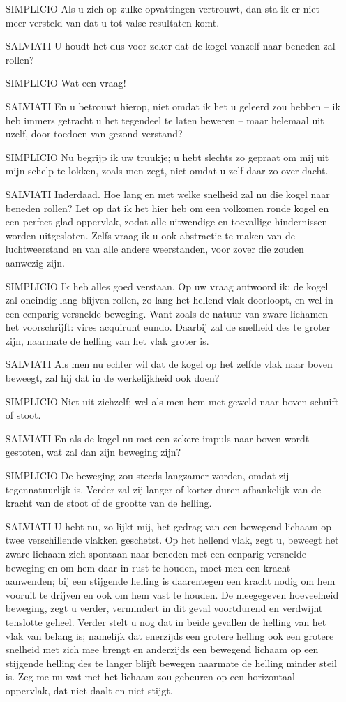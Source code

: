 {\begin{enumerate}
\item[SIMPLICIO]Als u zich op zulke opvattingen vertrouwt, dan sta ik er niet meer versteld van dat u tot valse resultaten komt.
\item[SALVIATI]U houdt het dus voor zeker dat de kogel vanzelf naar beneden zal rollen?
\item[SIMPLICIO]Wat een vraag!
\item[SALVIATI]En u betrouwt hierop, niet omdat ik het u geleerd zou hebben -- ik heb immers getracht u het tegendeel te laten beweren -- maar helemaal uit uzelf, door toedoen van gezond verstand?
\item[SIMPLICIO]Nu begrijp ik uw truukje; u hebt slechts zo gepraat om mij uit mijn schelp te lokken, zoals men zegt, niet omdat u zelf daar zo over dacht.
\item[SALVIATI]Inderdaad. Hoe lang en met welke snelheid zal nu die kogel naar beneden rollen? Let op dat ik het hier heb om een volkomen ronde kogel en een perfect glad oppervlak, zodat alle uitwendige en toevallige hindernissen worden uitgesloten. Zelfs vraag ik u ook abstractie te maken van de luchtweerstand en van alle andere weerstanden, voor zover die zouden aanwezig zijn.
\item[SIMPLICIO]Ik heb alles goed verstaan. Op uw vraag antwoord ik: de kogel zal oneindig lang blijven rollen, zo lang het hellend vlak doorloopt, en wel in een eenparig versnelde beweging. Want zoals de natuur van zware lichamen het voorschrijft: vires acquirunt eundo. Daarbij zal de snelheid des te groter zijn, naarmate de helling van het vlak groter is.
\item[SALVIATI]Als men nu echter wil dat de kogel op het zelfde vlak naar boven beweegt, zal hij dat in de werkelijkheid ook doen?
\item[SIMPLICIO]Niet uit zichzelf; wel als men hem met geweld naar boven schuift of stoot.
\item[SALVIATI]En als de kogel nu met een zekere impuls naar boven wordt gestoten, wat zal dan zijn beweging zijn?
\item[SIMPLICIO]De beweging zou steeds langzamer worden, omdat zij tegennatuurlijk is. Verder zal zij langer of korter duren afhankelijk van de kracht van de stoot of de grootte van de helling.
\item[SALVIATI]U hebt nu, zo lijkt mij, het gedrag van een bewegend lichaam op twee verschillende vlakken geschetst. Op het hellend vlak, zegt u, beweegt het zware lichaam zich spontaan naar beneden met een eenparig versnelde beweging en om hem daar in rust te houden, moet men een kracht aanwenden; bij een stijgende helling is daarentegen een kracht nodig om hem vooruit te drijven en ook om hem vast te houden. De meegegeven hoeveelheid beweging, zegt u verder, vermindert in dit geval voortdurend en verdwijnt tenslotte geheel. Verder stelt u nog dat in beide gevallen de helling van het vlak van belang is; namelijk dat enerzijds een grotere helling ook een grotere snelheid met zich mee brengt en anderzijds een bewegend lichaam op een stijgende helling des te langer blijft bewegen naarmate de helling minder steil is. Zeg me nu wat met het lichaam zou gebeuren op een horizontaal oppervlak, dat niet daalt en niet stijgt.

\end{enumerate}}
